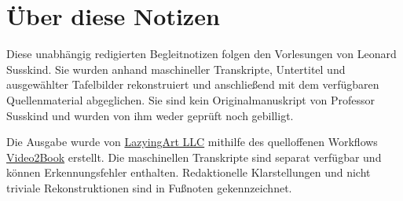 \documentclass[11pt,oneside]{book}
\begin{document}
\frontmatter
\hypersetup{pageanchor=false}

\hypersetup{pageanchor=true}

\clearpage
\chapter{Über diese Notizen}
Diese unabhängig redigierten Begleitnotizen folgen den Vorlesungen von Leonard Susskind. Sie wurden anhand maschineller Transkripte, Untertitel und ausgewählter Tafelbilder rekonstruiert und anschließend mit dem verfügbaren Quellenmaterial abgeglichen. Sie sind kein Originalmanuskript von Professor Susskind und wurden von ihm weder geprüft noch gebilligt.

Die Ausgabe wurde von \href{https://lazying.art}{LazyingArt LLC} mithilfe des quelloffenen Workflows \href{https://github.com/lachlanchen/Video2Book}{Video2Book} erstellt. Die maschinellen Transkripte sind separat verfügbar und können Erkennungsfehler enthalten. Redaktionelle Klarstellungen und nicht triviale Rekonstruktionen sind in Fußnoten gekennzeichnet.
\clearpage
\tableofcontents
\mainmatter










\end{document}
